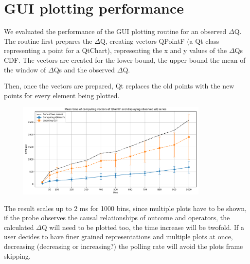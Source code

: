 \section{GUI plotting performance}
    We evaluated the performance of the GUI plotting routine for an observed $\Delta$Q. The routine first prepares the $\Delta$Q, creating vectors QPointF (a Qt class representing a point for a QtChart), representing the x and y values of the $\Delta$Qs CDF. The vectors are created for the lower bound, the upper bound the mean of the window of $\Delta$Qs and the observed $\Delta$Q.

    Then, once the vectors are prepared, Qt replaces the old points with the new points for every element being plotted.

    \begin{figure}[H]
        \begin{center}
            \includegraphics[width = 0.85\textwidth]{img/plots.pdf}
        \end{center}
    \end{figure}

    The result scales up to 2 ms for 1000 bins, since multiple plots have to be shown, if the probe observes the causal relationships of outcome and operators, the calculated $\Delta$Q will need to be plotted too, the time increase will be twofold. 
    If a user decides to have finer grained representations and multiple plots at once, decreasing (decreasing or increasing?) the polling rate will avoid the plots frame skipping.
